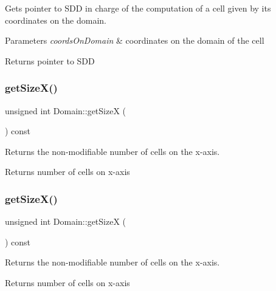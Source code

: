 Gets pointer to S\+DD in charge of the computation of a cell given by its coordinates on the domain. 


\begin{DoxyParams}{Parameters}
{\em coords\+On\+Domain} & coordinates on the domain of the cell\\
\hline
\end{DoxyParams}
\begin{DoxyReturn}{Returns}
pointer to S\+DD 
\end{DoxyReturn}
\mbox{\label{classDomain_a75f299e3871fe9cec01637b140429ef9}} 
\subsubsection{\texorpdfstring{get\+Size\+X()}{getSizeX()}\hspace{0.1cm}{\footnotesize\ttfamily [1/2]}}
{\footnotesize\ttfamily unsigned int Domain\+::get\+SizeX (\begin{DoxyParamCaption}{ }\end{DoxyParamCaption}) const}



Returns the non-\/modifiable number of cells on the x-\/axis. 

\begin{DoxyReturn}{Returns}
number of cells on x-\/axis 
\end{DoxyReturn}
\mbox{\label{classDomain_a75f299e3871fe9cec01637b140429ef9}} 
\subsubsection{\texorpdfstring{get\+Size\+X()}{getSizeX()}\hspace{0.1cm}{\footnotesize\ttfamily [2/2]}}
{\footnotesize\ttfamily unsigned int Domain\+::get\+SizeX (\begin{DoxyParamCaption}{ }\end{DoxyParamCaption}) const}



Returns the non-\/modifiable number of cells on the x-\/axis. 

\begin{DoxyReturn}{Returns}
number of cells on x-\/axis 
\end{DoxyReturn}
\mbox{\label{classDomain_a66692b4f23353c9b1fe884e583770cb3}} 
